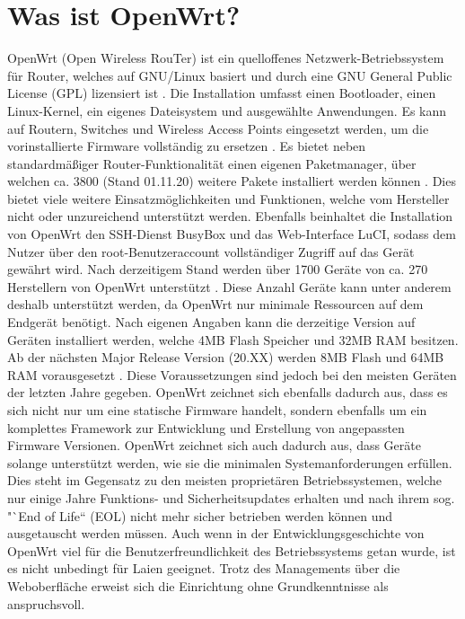 \documentclass[a4paper]{book}
\begin{document}
\begin{large}
\begin{onehalfspace}
\end{onehalfspace}


\section{Was ist OpenWrt?}
\label{OpenWrt}
\begin{onehalfspace}
OpenWrt (Open Wireless RouTer) ist ein quelloffenes Netzwerk-Betriebssystem für Router, welches auf GNU/Linux basiert und durch eine GNU General Public License (GPL) lizensiert ist \cite{OpenWrtWebseite.}. Die Installation umfasst einen Bootloader, einen Linux-Kernel, ein eigenes Dateisystem und ausgewählte Anwendungen. Es kann auf Routern, Switches und Wireless Access Points eingesetzt werden, um die vorinstallierte Firmware vollständig zu ersetzen \cite{OpenWrtWebseite.16.10.2020}. Es bietet neben standardmäßiger Router-Funktionalität einen eigenen Paketmanager, über welchen ca. 3800 (Stand 01.11.20) weitere Pakete installiert werden können \cite{OpenWrtWebseite.2020}. Dies bietet viele weitere Einsatzmöglichkeiten und Funktionen, welche vom Hersteller nicht oder unzureichend unterstützt werden. Ebenfalls beinhaltet die Installation von OpenWrt den SSH-Dienst BusyBox und das Web-Interface LuCI, sodass dem Nutzer über den root-Benutzeraccount vollständiger Zugriff auf das Gerät gewährt wird. Nach derzeitigem Stand werden über 1700 Geräte von ca. 270 Herstellern von OpenWrt unterstützt \cite{OpenWrtWebseite.18.01.2020}. Diese Anzahl Geräte kann unter anderem deshalb unterstützt werden, da OpenWrt nur minimale Ressourcen auf dem Endgerät benötigt. Nach eigenen Angaben kann die derzeitige Version auf Geräten installiert werden, welche 4MB Flash Speicher und 32MB RAM besitzen. Ab der nächsten \glqq Major Release\grqq{} Version (20.XX) werden 8MB Flash und 64MB RAM vorausgesetzt \cite{OpenWrtWebseite.18.01.2020}. Diese Voraussetzungen sind jedoch bei den meisten Geräten der letzten Jahre gegeben. OpenWrt zeichnet sich ebenfalls dadurch aus, dass es sich nicht nur um eine statische Firmware handelt, sondern ebenfalls um ein komplettes Framework zur Entwicklung und Erstellung von angepassten Firmware Versionen. OpenWrt zeichnet sich auch dadurch aus, dass Geräte solange unterstützt werden, wie sie die minimalen Systemanforderungen erfüllen. Dies steht im Gegensatz zu den meisten proprietären Betriebssystemen, welche nur einige Jahre Funktions- und Sicherheitsupdates erhalten und nach ihrem sog. "`End of Life“ (EOL) nicht mehr sicher betrieben werden können und ausgetauscht werden müssen. Auch wenn in der Entwicklungsgeschichte von OpenWrt viel für die Benutzerfreundlichkeit des Betriebssystems getan wurde, ist es nicht unbedingt für Laien geeignet. Trotz des Managements über die Weboberfläche erweist sich die Einrichtung ohne Grundkenntnisse als anspruchsvoll.\\

\end{onehalfspace}
\end{large}
\end{document}

